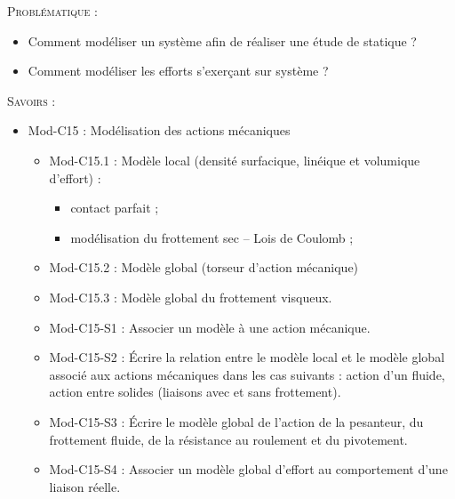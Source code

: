\documentclass[10pt]{article}
\begin{document}
\begin{prob}
\textsc{Problématique :}
\begin{itemize}
\item Comment modéliser un système afin de réaliser une étude de statique ?
\item Comment modéliser les efforts s'exerçant sur système ?
\end{itemize}
\end{prob}

\begin{savoir}
\textsc{Savoirs :}
\begin{itemize}
\item Mod-C15 : Modélisation des actions mécaniques
\begin{itemize}
\item Mod-C15.1 : Modèle local (densité surfacique, linéique et volumique d’effort) :
\begin{itemize}
\item contact parfait ;
\item modélisation du frottement sec -- Lois de Coulomb ;
\end{itemize}
\item Mod-C15.2 : Modèle global (torseur d’action mécanique)
\item Mod-C15.3 : Modèle global du frottement visqueux.
\end{itemize}
\begin{itemize}
\item Mod-C15-S1 : Associer un modèle à une action mécanique.
\item Mod-C15-S2 : Écrire la relation entre le modèle local et le modèle global associé aux actions mécaniques dans les cas suivants : action d’un fluide, action entre solides (liaisons avec et sans frottement).
\item Mod-C15-S3 : Écrire le modèle global de l’action de la pesanteur, du frottement fluide, de la résistance au roulement et du pivotement.
\item Mod-C15-S4 : Associer un modèle global d’effort au comportement d’une liaison réelle.
\end{itemize}
\end{itemize}
\end{savoir}

\setlength{\parskip}{0ex plus 0.2ex minus 0ex}
 \renewcommand{\contentsname}{}
 \renewcommand{\baselinestretch}{1}
\end{document}
